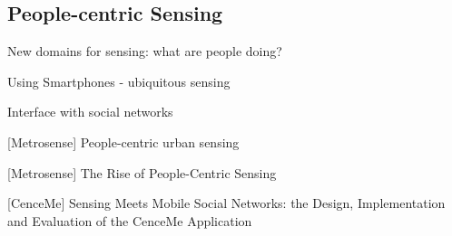 \subsection*{People-centric Sensing}
\label{people}

\begin{structure}
	\item New domains for sensing: what are people doing? 
	\item Using Smartphones - ubiquitous sensing
	\item Interface with social networks
\end{structure}

[Metrosense] People-centric urban sensing \cite{metrosense}

[Metrosense] The Rise of People-Centric Sensing \cite{metrosense-article}

[CenceMe] Sensing Meets Mobile Social Networks: the Design, Implementation and Evaluation of the CenceMe Application \cite{cenceme}
